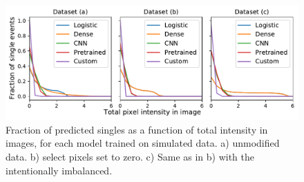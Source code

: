 \begin{figure}
\centering
\includegraphics[width=\textwidth]{chapters/results/figures/classification_experimental_single_fractions.pdf}
\caption{\label{fig:experimental-single-fractions}Fraction of predicted singles as a function of
total intensity in images, for each model trained on simulated data.  a) unmodified data. b) select pixels set to zero. 
c) Same as in b) with the intentionally imbalanced.}
\end{figure}